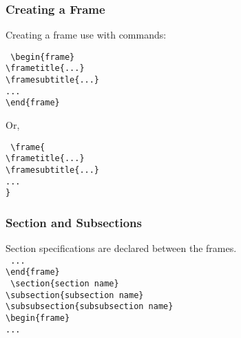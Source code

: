 \documentclass[article]{beamer}
\begin{document}

\begin{frame}
\frametitle{Creating a Frame}

Creating a frame use with commands:
\begin{block}{}
\scriptsize{\tt{
\textbackslash begin\{frame\} \\
\textbackslash frametitle\{...\} \\
\textbackslash framesubtitle\{...\} \\
...\\
\textbackslash end\{frame\}
}}
\end{block}
Or, 
\begin{block}{}
\scriptsize{\tt{
\textbackslash frame\{ \\
\textbackslash frametitle\{...\}\\
\textbackslash framesubtitle\{...\}\\
...\\
\}
}}
\end{block}
\end{frame}



\begin{frame}[fragile]
\frametitle{Section and Subsections}
Section specifications are declared between the frames.\\
\vspace{1cm}
\scriptsize{\tt{
...\\
\textbackslash end\{frame\}\\
\vspace{0.5cm}
\alert{
\textbackslash section\{section name\}\\
\textbackslash subsection\{subsection name\}\\
\textbackslash subsubsection\{subsubsection name\}}\\
\vspace{0.5cm}
\textbackslash begin\{frame\}\\
...\\
}
}

\end{frame}
\end{document}

